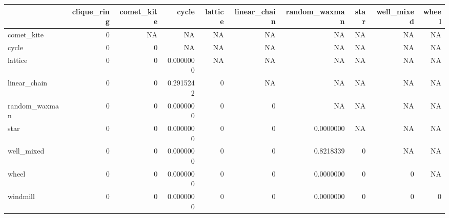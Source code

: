 \documentclass[
]{book}
\newenvironment{Shaded}{\begin{snugshade}}{\end{snugshade}}
\newcommand{\AttributeTok}[1]{\textcolor[rgb]{0.77,0.63,0.00}{#1}}
\newcommand{\ConstantTok}[1]{\textcolor[rgb]{0.00,0.00,0.00}{#1}}
\newcommand{\FunctionTok}[1]{\textcolor[rgb]{0.00,0.00,0.00}{#1}}
\newcommand{\NormalTok}[1]{#1}
\newcommand{\OtherTok}[1]{\textcolor[rgb]{0.56,0.35,0.01}{#1}}
\newcommand{\SpecialCharTok}[1]{\textcolor[rgb]{0.00,0.00,0.00}{#1}}
\newcommand{\StringTok}[1]{\textcolor[rgb]{0.31,0.60,0.02}{#1}}
\begin{document}
\begin{Shaded}
\end{Shaded}

\begin{table}
\centering
\begin{tabular}[t]{l|r|r|r|r|r|r|r|r|r}
\hline
  & clique\_ring & comet\_kite & cycle & lattice & linear\_chain & random\_waxman & star & well\_mixed & wheel\\
\hline
comet\_kite & 0 & NA & NA & NA & NA & NA & NA & NA & NA\\
\hline
cycle & 0 & 0 & NA & NA & NA & NA & NA & NA & NA\\
\hline
lattice & 0 & 0 & 0.0000000 & NA & NA & NA & NA & NA & NA\\
\hline
linear\_chain & 0 & 0 & 0.2915242 & 0 & NA & NA & NA & NA & NA\\
\hline
random\_waxman & 0 & 0 & 0.0000000 & 0 & 0 & NA & NA & NA & NA\\
\hline
star & 0 & 0 & 0.0000000 & 0 & 0 & 0.0000000 & NA & NA & NA\\
\hline
well\_mixed & 0 & 0 & 0.0000000 & 0 & 0 & 0.8218339 & 0 & NA & NA\\
\hline
wheel & 0 & 0 & 0.0000000 & 0 & 0 & 0.0000000 & 0 & 0 & NA\\
\hline
windmill & 0 & 0 & 0.0000000 & 0 & 0 & 0.0000000 & 0 & 0 & 0\\
\hline
\end{tabular}
\end{table}
\end{document}
